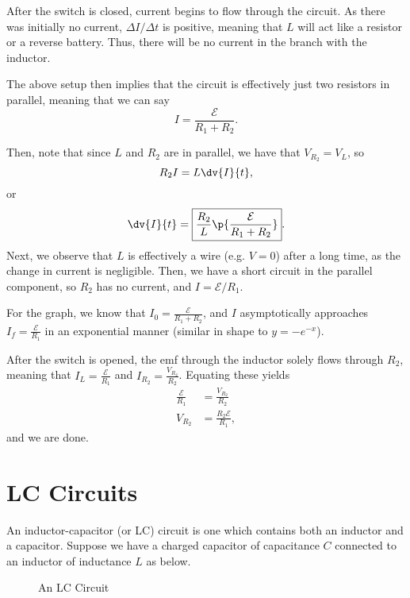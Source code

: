 \documentclass[11pt]{article}
\begin{document}
\begin{solution}
    After the switch is closed, current begins to flow through the circuit. As there was initially no current, $\Delta I/\Delta t$ is positive, meaning that $L$ will act like a resistor or a reverse battery. Thus, there will be no current in the branch with the inductor.
    
    The above setup then implies that the circuit is effectively just two resistors in parallel, meaning that we can say \[I = \boxed{\frac{\mathcal{E}}{R_1+R_2}}.\]
    
    Then, note that since $L$ and $R_2$ are in parallel, we have that $V_{R_2} = V_L$, so
    \[R_2I = L\dv{I}{t},\]
    or \[\dv{I}{t} = \boxed{\frac{R_2}{L}\p{\frac{\mathcal{E}}{R_1+R_2}}}.\]
    Next, we observe that $L$ is effectively a wire (e.g. $V = 0$) after a long time, as the change in current is negligible. Then, we have a short circuit in the parallel component, so $R_2$ has no current, and $I = \boxed{\mathcal{E}/R_1}$.
    
    For the graph, we know that $I_0 = \frac{\mathcal{E}}{R_1 + R_2}$, and $I$ asymptotically approaches $I_f = \frac{\mathcal{E}}{R_1}$ in an exponential manner (similar in shape to $y = -e^{-x}$).
    
    After the switch is opened, the emf through the inductor solely flows through $R_2$, meaning that $I_L = \frac{\mathcal{E}}{R_1}$ and $I_{R_2} = \frac{V_{R_2}}{R_2}$. Equating these yields
    \begin{align*}
        \frac{\mathcal{E}}{R_1} &= \frac{V_{R_2}}{R_2} \\
        V_{R_{2}} &= \boxed{\frac{R_2\mathcal{E}}{R_1}},
    \end{align*}
    and we are done.
\end{solution}
\section{LC Circuits}
An inductor-capacitor (or LC) circuit is one which contains both an inductor and a capacitor. Suppose we have a charged capacitor of capacitance $C$ connected to an inductor of inductance $L$ as below.
\begin{figure}[h!b]
    \centering
    \caption{An LC Circuit}
\end{figure}
\end{document}

